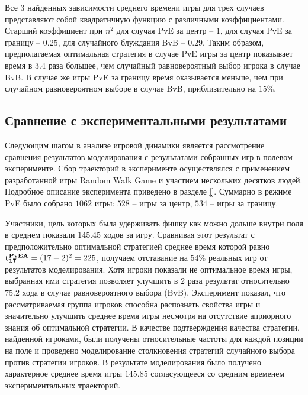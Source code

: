 Все 3 найденных зависимости среднего времени игры для трех случаев представляют собой квадратичную функцию с различными коэффициентами.
Старший коэффициент при $n^2$ для случая PvE за центр -- $1$, для случая PvE за границу -- $0.25$, для случайного блуждания BvB -- $0.29$.
Таким образом, предполагаемая оптимальная стратегия в случае PvE игры за центр показывает время в $3.4$ раза большее, чем случайный равновероятный выбор игрока в случае BvB.
В случае же игры PvE за границу время оказывается меньше, чем при случайном равновероятном выборе в случае BvB, приблизительно на $15\%$.


\subsection{Сравнение с экспериментальными результатами}\label{subsec:ch3/sec1/sub1}

Следующим шагом в анализе игровой динамики является рассмотрение сравнения результатов моделирования с результатами 
собранных игр в полевом эксперименте. Сбор траекторий в эксперименте осуществлялся с применением разработанной игры Random Walk Game
и участием нескольких десятков людей. Подробное описание эксперимента приведено в разделе \cref{}. Суммарно в режиме 
PvE было собрано $1062$ игры: $528$ -- игры за центр, $534$ -- игры за границу. 

Участники, цель которых была удерживать фишку как можно
дольше внутри поля в среднем показали $145.45$ ходов за игру. Сравнивая этот результат с предположительно оптимальной стратегией 
среднее время которой равно ${\bf t_{17}^{PvE A}} = (17-2)^2 = 225$, получаем отставание на $54\%$ реальных игр от результатов моделирования.
Хотя игроки показали не оптимальное время игры, выбранная ими стратегия позволяет улучшить в $2$ раза результат относительно $75.2$ хода
в случае равновероятного выбора (BvB). Эксперимент показал, что рассматриваемая группа игроков способна распознать свойства игры 
и значительно улучшить среднее время игры несмотря на отсутствие априорного знания об оптимальной стратегии. 
В качестве подтверждения качества стратегии, найденной игроками, были получены относительные частоты для каждой позиции на поле
и проведено моделирование столкновения стратегий случайного выбора против стратегии игроков. В результате моделирования было получено 
характерное среднее время игры $145.85$ согласующееся со средним временем экспериментальных траекторий.

